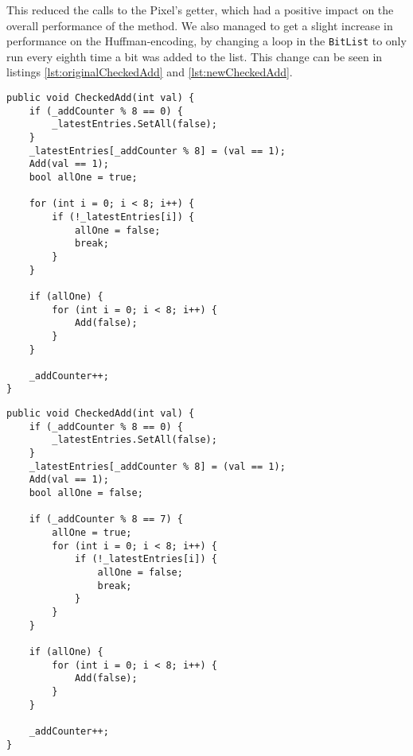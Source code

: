 This reduced the calls to the Pixel's getter, which had a positive impact on the overall performance of the method.
We also managed to get a slight increase in performance on the Huffman-encoding, by changing a loop in the \lstinline|BitList| to only run every eighth time a bit was added to the list.
This change can be seen in listings \ref{lst:originalCheckedAdd} and \ref{lst:newCheckedAdd}.

\begin{lstlisting}[firstnumber=85,label=lst:originalCheckedAdd, caption={Original \lstinline|CheckedAdd| in \lstinline|BitList|. Note the for-loop on line 93. It always runs.}]
public void CheckedAdd(int val) {
    if (_addCounter % 8 == 0) {
        _latestEntries.SetAll(false);
    }
    _latestEntries[_addCounter % 8] = (val == 1);
    Add(val == 1);
    bool allOne = true;

    for (int i = 0; i < 8; i++) {
        if (!_latestEntries[i]) {
            allOne = false;
            break;
        }
    }

    if (allOne) {
        for (int i = 0; i < 8; i++) {
            Add(false);
        }
    }

    _addCounter++;
}
\end{lstlisting}

\begin{lstlisting}[firstnumber=26,label=lst:newCheckedAdd, caption={Improved \lstinline|CheckedAdd| in \lstinline|BitList|. The for-loop only runs an eighth of the time.}]
public void CheckedAdd(int val) {
    if (_addCounter % 8 == 0) {
        _latestEntries.SetAll(false);
    }
    _latestEntries[_addCounter % 8] = (val == 1);
    Add(val == 1);
    bool allOne = false;

    if (_addCounter % 8 == 7) {
        allOne = true;
        for (int i = 0; i < 8; i++) {
            if (!_latestEntries[i]) {
                allOne = false;
                break;
            }
        }
    }

    if (allOne) {
        for (int i = 0; i < 8; i++) {
            Add(false);
        }
    }

    _addCounter++;
}
\end{lstlisting}

